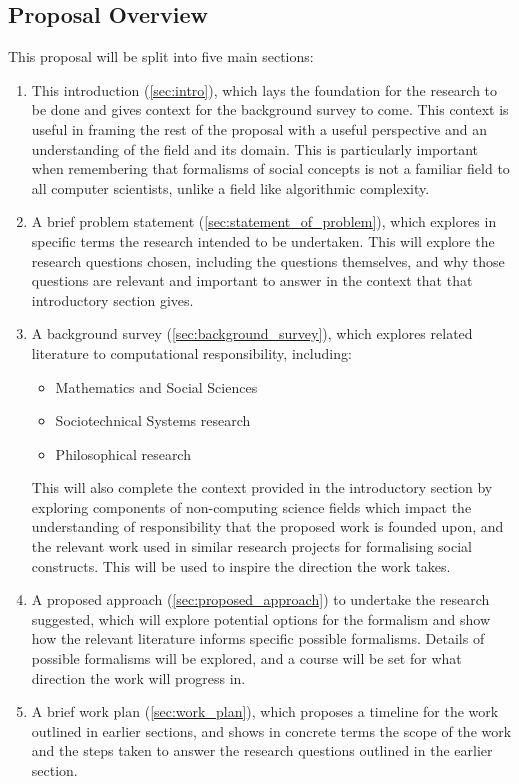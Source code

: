 \subsection{Proposal Overview}\label{subsec:overview}
This proposal will be split into five main sections:\\
\begin{enumerate}
    \item This introduction (\cref{sec:intro}), which lays the foundation for the research to be done and gives context for the background survey to come.\newline
        This context is useful in framing the rest of the proposal with a useful perspective and an understanding of the field and its domain. This is particularly important when remembering that formalisms of social concepts is not a familiar field to all computer scientists, unlike a field like algorithmic complexity.
    \item A brief problem statement (\cref{sec:statement_of_problem}), which explores in specific terms the research intended to be undertaken. \newline
        This will explore the research questions chosen, including the questions themselves, and why those questions are relevant and important to answer in the context that that introductory section gives.
    \item A background survey (\cref{sec:background_survey}), which explores related literature to computational responsibility, including:\\
        \begin{itemize}
            \item Mathematics and Social Sciences
            \item Sociotechnical Systems research
            \item Philosophical research
        \end{itemize}
        This will also complete the context provided in the introductory section by exploring components of non-computing science fields which impact the understanding of responsibility that the proposed work is founded upon, and the relevant work used in similar research projects for formalising social constructs. This will be used to inspire the direction the work takes.
    \item A proposed approach (\cref{sec:proposed_approach}) to undertake the research suggested, which will explore potential options for the formalism and show how the relevant literature informs specific possible formalisms. \newline
        Details of possible formalisms will be explored, and a course will be set for what direction the work will progress in.
    \item A brief work plan (\cref{sec:work_plan}), which proposes a timeline for the work outlined in earlier sections, and shows in concrete terms the scope of the work and the steps taken to answer the research questions outlined in the earlier section.
\end{enumerate}
